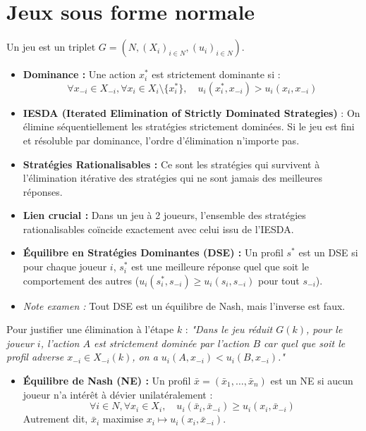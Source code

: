 \documentclass[10pt,a4paper]{article}
\begin{document}
\section{Jeux sous forme normale}
Un jeu est un triplet $G = (N, (X_i)_{i \in N}, (u_i)_{i \in N})$.
\begin{itemize}[leftmargin=*]
    \item \textbf{Dominance :} Une action $x_i^*$ est strictement dominante si :
    \[ \forall x_{-i} \in X_{-i}, \forall x_i \in X_i \setminus \{x_i^*\}, \quad u_i(x_i^*, x_{-i}) > u_i(x_i, x_{-i}) \]
    \item \textbf{IESDA (Iterated Elimination of Strictly Dominated Strategies)} :
    On élimine séquentiellement les stratégies strictement dominées. Si le jeu est fini et résoluble par dominance, l'ordre d'élimination n'importe pas.
\end{itemize}

\begin{itemize}[leftmargin=*]
    \item \textbf{Stratégies Rationalisables :} Ce sont les stratégies qui survivent à l'élimination itérative des stratégies qui ne sont jamais des meilleures réponses.
    \item \textbf{Lien crucial :} Dans un jeu à 2 joueurs, l'ensemble des stratégies rationalisables coïncide exactement avec celui issu de l'IESDA.
    \item \textbf{Équilibre en Stratégies Dominantes (DSE) :} Un profil $s^*$ est un DSE si pour chaque joueur $i$, $s_i^*$ est une meilleure réponse quel que soit le comportement des autres ($u_i(s_i^*, s_{-i}) \geq u_i(s_i, s_{-i})$ pour tout $s_{-i}$).
    \item \textit{Note examen :} Tout DSE est un équilibre de Nash, mais l'inverse est faux.
\end{itemize}

\begin{tcolorbox}[colback=blue!5,colframe=myblue,title=Rigueur Examen : Rédaction IESDA]
Pour justifier une élimination à l'étape $k$ :
\textit{"Dans le jeu réduit $G(k)$, pour le joueur $i$, l'action $A$ est strictement dominée par l'action $B$ car quel que soit le profil adverse $x_{-i} \in X_{-i}(k)$, on a $u_i(A, x_{-i}) < u_i(B, x_{-i})$."}
\end{tcolorbox}

\begin{itemize}[leftmargin=*]
    \item \textbf{Équilibre de Nash (NE) :} Un profil $\bar{x} = (\bar{x}_1, \dots, \bar{x}_n)$ est un NE si aucun joueur n'a intérêt à dévier unilatéralement :
    \[ \forall i \in N, \forall x_i \in X_i, \quad u_i(\bar{x}_i, \bar{x}_{-i}) \geq u_i(x_i, \bar{x}_{-i}) \]
    Autrement dit, $\bar{x}_i$ maximise $x_i \mapsto u_i(x_i, \bar{x}_{-i})$.
\end{itemize}
\end{document}
